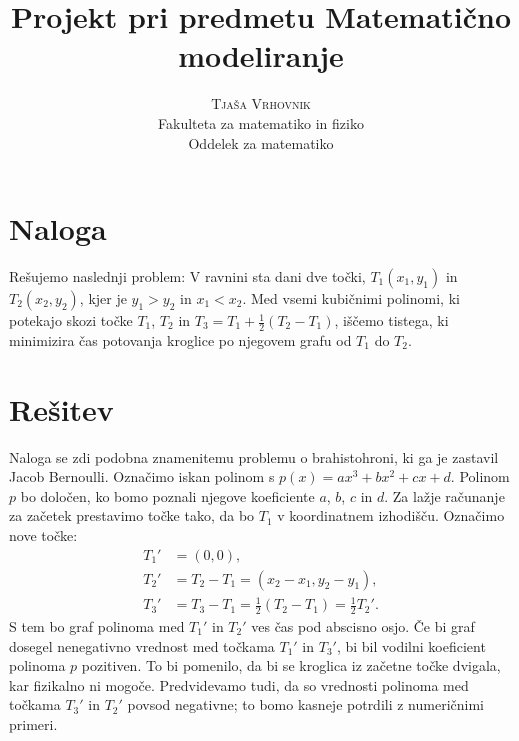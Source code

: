 \documentclass[a4paper]{article}
\begin{document}
\title{\Huge\textbf{Projekt pri predmetu Matematično modeliranje}} 
\author{\large\textsc{Tjaša Vrhovnik}\\
	Fakulteta za matematiko in fiziko\\
	Oddelek za matematiko}

\thispagestyle{empty}

\maketitle

\newpage


\section{Naloga}

Rešujemo naslednji problem: V ravnini sta dani dve točki, $T_{1}(x_1,y_1)$ in $T_{2}(x_2,y_2)$, kjer je $y_1 > y_2$ in $x_1 < x_2$. Med vsemi kubičnimi polinomi, ki potekajo skozi točke $T_1$, $T_2$ in $T_3 = T_1 + \frac{1}{2} (T_2-T_1)$, iščemo tistega, ki minimizira čas potovanja kroglice po njegovem grafu od $T_1$ do $T_2$.

\section{Rešitev}

Naloga se zdi podobna znamenitemu problemu o brahistohroni, ki ga je zastavil Jacob Bernoulli.
Označimo iskan polinom s $p(x) = ax^3+bx^2+cx+d$. Polinom $p$ bo določen, ko bomo poznali njegove koeficiente $a$, $b$, $c$ in $d$.
Za lažje računanje za začetek prestavimo točke tako, da bo $T_1$ v koordinatnem izhodišču. Označimo nove točke:
\begin{align*}
T_{1}' &= (0,0), \\
T_{2}' &= T_2 - T_1 = (x_2-x_1, y_2-y_1), \\
T_{3}' &= T_3 - T_1 = \frac{1}{2}(T_2 - T_1) = \frac{1}{2}T_{2}'.
\end{align*}
S tem bo graf polinoma med $T_{1}'$ in $T_{2}'$ ves čas pod abscisno osjo. Če bi graf dosegel nenegativno vrednost med točkama $T_{1}'$ in $T_{3}'$, bi bil vodilni koeficient polinoma $p$ pozitiven. To bi pomenilo, da bi se kroglica iz začetne točke dvigala, kar fizikalno ni mogoče. Predvidevamo tudi, da so vrednosti polinoma med točkama $T_{3}'$ in $T_{2}'$ povsod negativne; to bomo kasneje potrdili z numeričnimi primeri.
\end{document}
